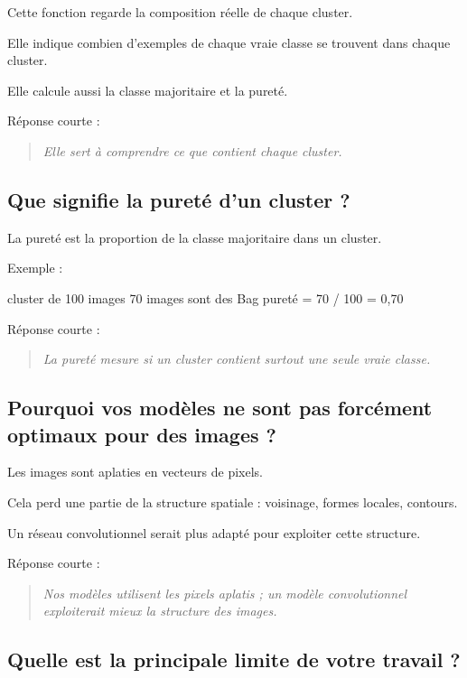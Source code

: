 \documentclass[11pt,a4paper]{article}
\begin{document}
Cette fonction regarde la composition réelle de chaque cluster.

Elle indique combien d'exemples de chaque vraie classe se trouvent dans chaque cluster.

Elle calcule aussi la classe majoritaire et la pureté.

Réponse courte :

\begin{quote}
\itshape Elle sert à comprendre ce que contient chaque cluster.
\end{quote}

\subsection{Que signifie la pureté d'un cluster ?}

La pureté est la proportion de la classe majoritaire dans un cluster.

Exemple :

\begin{codeblock}
cluster de 100 images
70 images sont des Bag
pureté = 70 / 100 = 0,70
\end{codeblock}

Réponse courte :

\begin{quote}
\itshape La pureté mesure si un cluster contient surtout une seule vraie classe.
\end{quote}

\subsection{Pourquoi vos modèles ne sont pas forcément optimaux pour des images ?}

Les images sont aplaties en vecteurs de pixels.

Cela perd une partie de la structure spatiale : voisinage, formes locales, contours.

Un réseau convolutionnel serait plus adapté pour exploiter cette structure.

Réponse courte :

\begin{quote}
\itshape Nos modèles utilisent les pixels aplatis ; un modèle convolutionnel exploiterait mieux la structure des images.
\end{quote}

\subsection{Quelle est la principale limite de votre travail ?}
\end{document}
